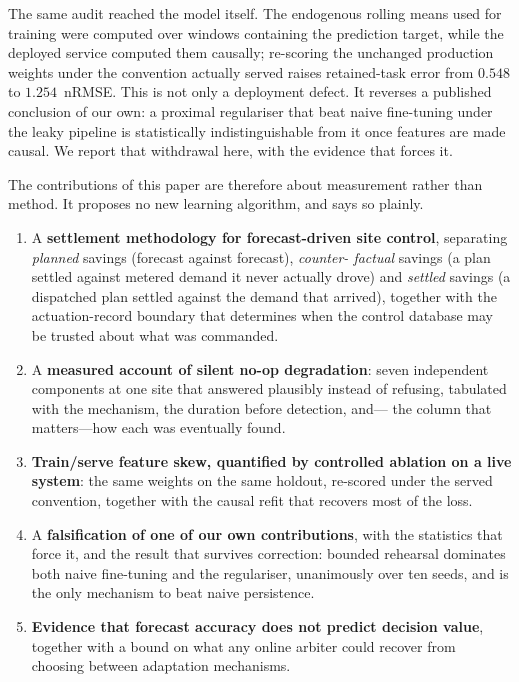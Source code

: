 The same audit reached the model itself. The endogenous rolling means used for
training were computed over windows containing the prediction target, while the
deployed service computed them causally; re-scoring the unchanged production
weights under the convention actually served raises retained-task error from
$0.548$ to $1.254$~nRMSE. This is not only a deployment defect. It reverses a
published conclusion of our own: a proximal regulariser that beat naive
fine-tuning under the leaky pipeline is statistically indistinguishable from it
once features are made causal. We report that withdrawal here, with the
evidence that forces it.

The contributions of this paper are therefore about measurement rather than
method. It proposes no new learning algorithm, and says so plainly.

\begin{enumerate}

\item A \textbf{settlement methodology for forecast-driven site control},
separating \emph{planned} savings (forecast against forecast), \emph{counter-
factual} savings (a plan settled against metered demand it never actually
drove) and \emph{settled} savings (a dispatched plan settled against the
demand that arrived), together with the actuation-record boundary that
determines when the control database may be trusted about what was commanded.

\item A \textbf{measured account of silent no-op degradation}: seven
independent components at one site that answered plausibly instead of
refusing, tabulated with the mechanism, the duration before detection, and---
the column that matters---how each was eventually found.

\item \textbf{Train/serve feature skew, quantified by controlled ablation on a
live system}: the same weights on the same holdout, re-scored under the served
convention, together with the causal refit that recovers most of the loss.

\item A \textbf{falsification of one of our own contributions}, with the
statistics that force it, and the result that survives correction: bounded
rehearsal dominates both naive fine-tuning and the regulariser, unanimously
over ten seeds, and is the only mechanism to beat naive persistence.

\item \textbf{Evidence that forecast accuracy does not predict decision
value}, together with a bound on what any online arbiter could recover from
choosing between adaptation mechanisms.

\end{enumerate}

